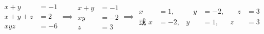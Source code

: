 \begin{equation}\label{eq:trinary}
\begin{aligned} x+y &= -1 \\ x+y+z &= 2 \\ xyz &= -6 \end{aligned}
\implies
\begin{aligned} x+y &= -1 \\ xy &= -2 \\ z &= 3 \end{aligned}
\implies
\begin{alignedat}{3}
             x &= 1,  &\quad y &= -2, &\quad z &= 3 \\
\text{或\ }  x &= -2, &      y &= 1,  &      z &= 3
\end{alignedat}
\end{equation}
